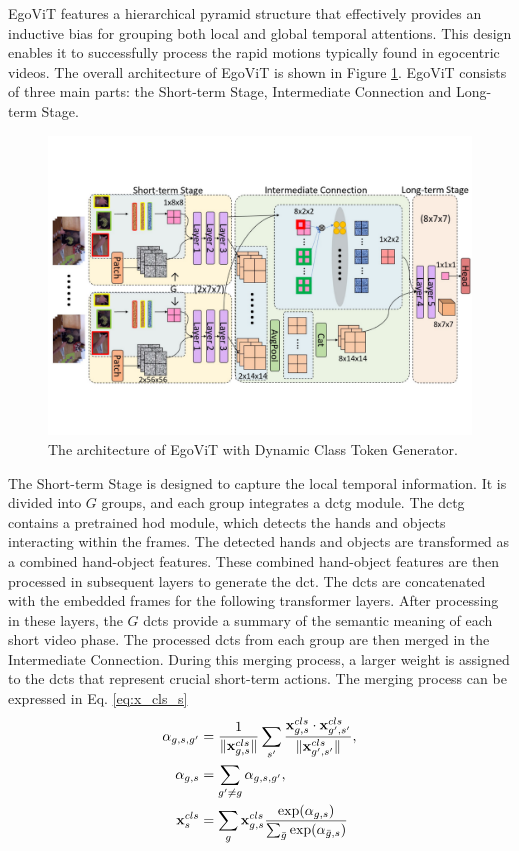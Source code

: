 EgoViT features a hierarchical pyramid structure that effectively provides an inductive bias for grouping both local and global temporal attentions. This design enables it to successfully process the rapid motions typically found in egocentric videos. The overall architecture of EgoViT is shown in Figure \ref{fig:egovit}. EgoViT consists of three main parts: the Short-term Stage, Intermediate Connection and Long-term Stage.
\begin{figure}[b]
    \centering
    \includegraphics[width=\textwidth]{graphics/egovit.pdf}
    \caption{The architecture of EgoViT with Dynamic Class Token Generator\cite{pan_egovit_2023}.}
    \label{fig:egovit}
\end{figure}

The Short-term Stage is designed to capture the local temporal information. It is divided into $G$ groups, and each group integrates a \gls{dctg} module. The \gls{dctg} contains a pretrained \gls{hod} module, which detects the hands and objects interacting within the frames. The detected hands and objects are transformed as a combined hand-object features. These combined hand-object features are then processed in subsequent layers to generate the \gls{dct}. The \gls{dct}s are concatenated with the embedded frames for the following transformer layers. After processing in these layers, the $G$ \gls{dct}s provide a summary of the semantic meaning of each short video phase. The processed \gls{dct}s from each group are then merged in the Intermediate Connection. During this merging process, a larger weight is assigned to the \gls{dct}s that represent crucial short-term actions.
The merging process can be expressed in Eq. \ref{eq:x_cls_s}
\begin{align}
    \alpha_{g,s,g'} &= \frac{1}{\|\mathbf{x}^{cls}_{g,s}\|} \sum_{s'} \frac{\mathbf{x}^{cls}_{g,s} \cdot \mathbf{x}^{cls}_{g',s'}}{\|\mathbf{x}^{cls}_{g',s'}\|}, \notag \\
    \alpha_{g,s} &= \sum_{g' \neq g} \alpha_{g,s,g'}, \notag \\
    \mathbf{x}^{cls}_{s} &= \sum_{g} \mathbf{x}^{cls}_{g,s} \frac{\exp(\alpha_{g,s})}{\sum_{\bar{g}} \exp(\alpha_{\bar{g},s})} \label{eq:x_cls_s}
    \end{align}


